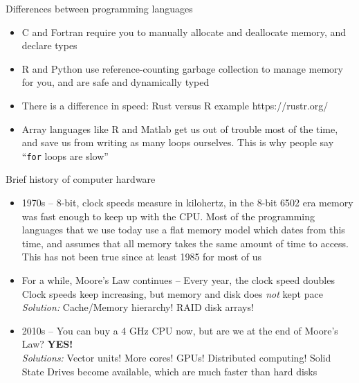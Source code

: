 \documentclass{beamer}
\begin{document}
\begin{frame}{Differences between programming languages}
	\begin{itemize}	
		\item C and Fortran require you to manually allocate and deallocate memory, and declare types 
		\item R and Python use reference-counting garbage collection to manage memory for you, and are safe and dynamically typed 
\item There is a difference in speed: Rust versus R example https://rustr.org/
\item Array languages like R and Matlab get us out of trouble most of the time, and save us from writing as many loops ourselves. This is why people say ``\texttt{for} loops are slow''
	\end{itemize}
\end{frame}

\begin{frame}{Brief history of computer hardware}
	\begin{itemize}
 \item 1970s -- 8-bit, clock speeds measure in kilohertz, in the 8-bit 6502 era memory was fast enough to keep up with the CPU. Most of the programming languages that we use today use a flat memory model which dates from this time, and assumes that all memory takes the same amount of time to access. This has not been true since at least 1985 for most of us
\item For a while, Moore's Law continues -- Every year, the clock speed doubles \\
	Clock speeds keep increasing, but memory and disk does \emph{not} kept pace \\
	\emph{Solution:} Cache/Memory hierarchy! RAID disk arrays!

\item	2010s -- You can buy a 4 GHz CPU now, but are we at the end of Moore's Law? \textbf{YES!}\\
	\emph{Solutions:} Vector units! More cores! GPUs! Distributed computing! Solid State Drives become available, which are much faster than hard disks
	\end{itemize}
\end{frame}
\end{document}
